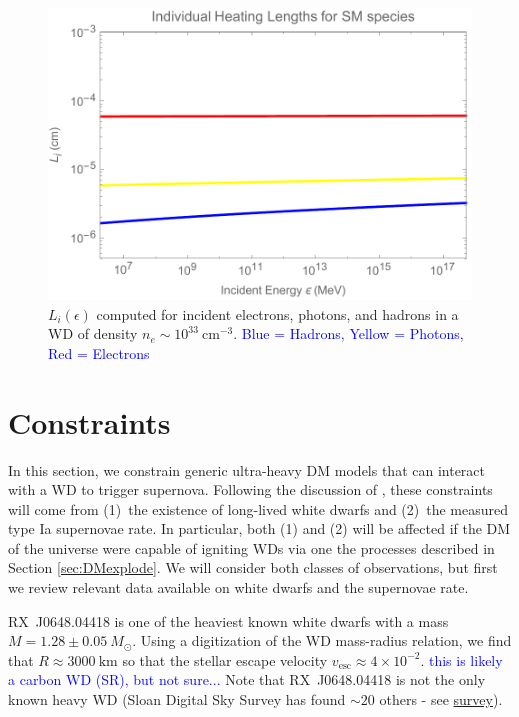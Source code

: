 \documentclass[twocolumn,showpacs,preprintnumbers,amsmath,amssymb,prd]{revtex4}
\begin{document}
\begin{figure}
\includegraphics[scale=.45]{cashmoney.pdf}
\caption{$L_i (\epsilon)$ computed for incident electrons, photons, and hadrons in a WD of density $n_e \sim 10^{33} ~\text{cm}^{-3}$. \textcolor{blue}{Blue = Hadrons, Yellow = Photons, Red = Electrons}}
\label{fig:cash}
\end{figure}


\section{Constraints}
\label{sec:Constraints}

In this section, we constrain generic ultra-heavy DM models that can interact with a WD to trigger supernova. Following the discussion of \cite{Graham:2015apa}, these constraints will come from (1)~the existence of long-lived white dwarfs and (2)~the measured type Ia supernovae rate. In particular, both (1) and (2) will be affected if the DM of the universe were capable of igniting WDs via one the processes described in Section \ref{sec:DMexplode}. We will consider both classes of observations, but first we review relevant data available on white dwarfs and the supernovae rate.

RX~J0648.04418 is one of the heaviest known white dwarfs with a mass $M = 1.28\pm 0.05 ~M_{\odot}$. Using a digitization of the WD mass-radius relation, we find that $R \approx 3000~\text{km}$ so that the stellar escape velocity $v_\text{esc} \approx 4 \times 10^{-2}$. \textcolor{blue}{this is likely a carbon WD (SR), but not sure...} Note that RX~J0648.04418 is not the only known heavy WD (Sloan Digital Sky Survey has found $\sim 20$ others - see \href{https://heasarc.gsfc.nasa.gov/db-perl/W3Browse/w3hdprods.pl}{survey}).
\end{document}
